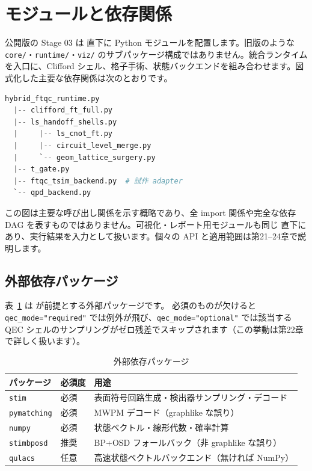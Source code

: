 \section{モジュールと依存関係}\label{sec:seven_files}

公開版の Stage 03 は  直下に Python モジュールを配置します。旧版のような \texttt{core/}・\texttt{runtime/}・\texttt{viz/} のサブパッケージ構成ではありません。統合ランタイムを入口に、Clifford シェル、格子手術、状態バックエンドを組み合わせます。図式化した主要な依存関係は次のとおりです。

\begin{lstlisting}[language=Python, caption={Stage 03 の主要モジュール間の呼び出し関係}]
hybrid_ftqc_runtime.py
  |-- clifford_ft_full.py
  |-- ls_handoff_shells.py
  |     |-- ls_cnot_ft.py
  |     |-- circuit_level_merge.py
  |     `-- geom_lattice_surgery.py
  |-- t_gate.py
  |-- ftqc_tsim_backend.py  # 試作 adapter
  `-- qpd_backend.py
\end{lstlisting}
\label{lst:dep_tree}

この図は主要な呼び出し関係を示す概略であり、全 import 関係や完全な依存 DAG を表すものではありません。可視化・レポート用モジュールも同じ  直下にあり、実行結果を入力として扱います。個々の API と適用範囲は第21–24章で説明します。

\subsection{外部依存パッケージ}

表~\ref{tab:extdeps} は  が前提とする外部パッケージです。
必須のものが欠けると \lstinline{qec_mode="required"} では例外が飛び、\lstinline{qec_mode="optional"} では該当する QEC シェルのサンプリングがゼロ残差でスキップされます（この挙動は第22章で詳しく扱います）。

\begin{table}[htbp]
  \centering
  \caption{外部依存パッケージ}
  \label{tab:extdeps}
  \begin{tabular}{lll}
    \hline
    パッケージ & 必須度 & 用途 \\
    \hline
    \texttt{stim} & 必須 & 表面符号回路生成・検出器サンプリング・デコード \\
    \texttt{pymatching} & 必須 & MWPM デコード（graphlike な誤り） \\
    \texttt{numpy} & 必須 & 状態ベクトル・線形代数・確率計算 \\
    \texttt{stimbposd} & 推奨 & BP+OSD フォールバック（非 graphlike な誤り） \\
    \texttt{qulacs} & 任意 & 高速状態ベクトルバックエンド（無ければ NumPy） \\
    \hline
  \end{tabular}
\end{table}


